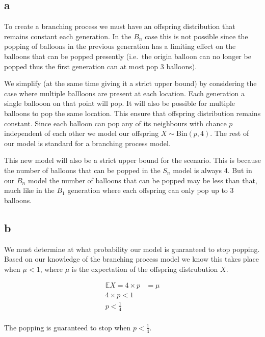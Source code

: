 \documentclass{article}
\newcommand{\expect}{\mathbb{E}}
\begin{document}
\subsection{a}
To create a branching process we must have an offspring distribution that
remains constant each generation. In the $B_n$ case this is not possible
since the popping of balloons in the previous generation has a limiting
effect on the balloons that can be popped presently (i.e.\ the origin
balloon can no longer be popped thus the first generation can at most pop
3 balloons).

We simplify (at the same time giving it a strict upper bound) by considering
the case where multiple ballloons are present at each location. Each generation
a single ballooon on that point will pop. It will also be possible for multiple
balloons to pop the same location. This ensure that offspring distribution
remains constant. Since each balloon can pop any of its neighbours with
chance $p$ independent of each other we model our offspring
$X \sim \text{Bin}(p,4)$. The rest of our model is standard for a branching
process model.

This new model will also be a strict upper bound for the scenario. This is
because the number of balloons that can be popped in the $S_n$ model is always
4. But in our $B_n$ model the number of balloons that can be popped may be
less than that, much like in the $B_1$ generation where each offspring
can only pop up to 3 balloons.

\subsection{b}
We must determine at what probability our model is guaranteed to stop popping.
Based on our knowledge of the branching process model we know this takes place
when $\mu < 1$, where $\mu$ is the expectation of the offspring distrubution
$X$.

\begin{align*}
    \expect X = 4\times p &= \mu \\
    4\times p < 1  \\
    p < \frac{1}{4}  \\
\end{align*}

The popping is guaranteed to stop when $p < \frac{1}{4}$.
\end{document}
